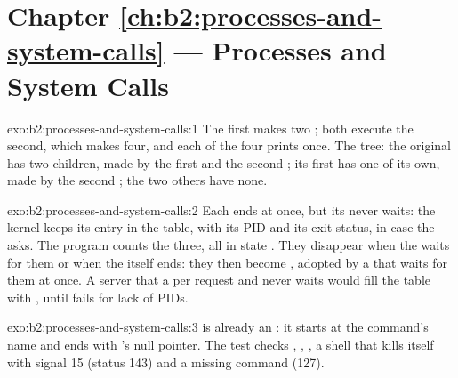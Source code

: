 \section*{Chapter \ref{ch:b2:processes-and-system-calls} --- Processes and System Calls}

\begin{solution}{exo:b2:processes-and-system-calls:1}
The first  makes two ; both execute the second, which makes four, and each of the four prints
once. The tree: the original  has two children, made by the first and the second ; its first  has
one  of its own, made by the second ; the two others have none.
\end{solution}

\begin{solution}{exo:b2:processes-and-system-calls:2}
Each  ends at once, but its  never waits: the kernel keeps its entry in the  table, with its PID
and its exit status, in case the  asks. The program counts the three, all in state . They disappear
when the  waits for them or when the  itself ends: they then become , adopted by a  that
waits for them at once. A server that  a  per request and never waits would fill the  table with
, until  fails for lack of PIDs.
\end{solution}

\begin{solution}{exo:b2:processes-and-system-calls:3}
 is already an : it starts at the command's name and ends with 's null
pointer. The test checks , , , a shell that kills itself with signal 15 (status
143) and a missing command (127).
\end{solution}

